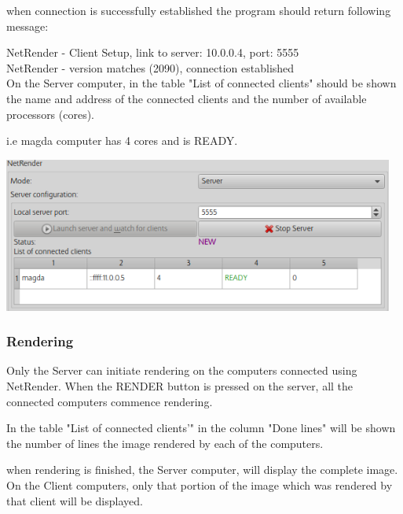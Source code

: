 when connection is successfully established the program should return following
message:

NetRender - Client Setup, link to server: 10.0.0.4, port: 5555\\ NetRender -
version matches (2090), connection established\\[2\baselineskip]On the Server
computer, in the table "List of connected clients" should be shown the name and
address of the connected clients and the number of available processors (cores).

i.e magda computer has 4 cores and is READY.

\includegraphics[width=5.07283in,height=1.99843in]{img/manual/media/image30.png}

\subsubsection{Rendering}\label{rendering}

Only the Server can initiate rendering on the computers connected using
NetRender. When the RENDER button is pressed on the server, all the connected
computers commence rendering.

In the table "List of connected clients'" in the column "Done lines" will be
shown the number of lines the image rendered by each of the computers.

when rendering is finished, the Server computer, will display the complete
image. On the Client computers, only that portion of the image which was
rendered by that client will be displayed.

